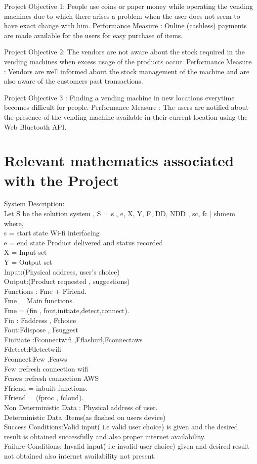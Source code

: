 \documentclass[oneside,a4paper,12pt]{report}
\begin{document}
Project Objective 1:
People use coins or paper money while operating the vending machines due to which there arises a problem when the user does not seem to have exact change with him.
Performance Measure :
Online (cashless) payments are made available for the users for easy purchase of items.

Project Objective 2:
The vendors are not aware about the stock required in the vending machines when excess usage of the products occur.
Performance Measure :
Vendors are well informed about the stock management of the machine and are also aware of the customers past transactions.

Project Objective 3 :
Finding a vending machine in new locations everytime becomes difficult for people.
Performance Measure :
The users are notified about the presence of the vending machine available in their current location using the Web Bluetooth API.
	
\section{Relevant mathematics associated with the Project}
\label{sec:math}
System Description:\\
 Let S be the solution system ,
	  S = {s , e, X, Y, F, DD, NDD , sc, fc | shmem}\\
            where,    \\   
s = start state {Wi-fi interfacing}\\
e = end state { Product delivered and status recorded}\\
X = Input set\\
Y = Output set\\
Input:(Physical address, user’s choice)	\\ 
Output:(Product requested , suggestions)\\ 
Functions : Fme + Ffriend.\\
Fme = Main functions.\\
Fme = (fin , fout,initiate,detect,connect).\\
Fin : {Faddress , Fchoice}\\
Fout:{Fdispose , Fsuggest}\\
Finitiate :{Fconnectwifi ,Fflashurl,Fconnectaws}\\
Fdetect:{Fdetectwifi}\\
Fconnect:{Fcw ,Fcaws}\\
Fcw :refresh connection wifi\\
Fcaws :refresh connection AWS\\
Ffriend = inbuilt functions.\\
Ffriend = (fproc , fcloud).\\
Non Deterministic Data : Physical address of user.\\
Deterministic Data :Items(as flashed on users device)\\
Success Conditions:Valid input( i.e valid user choice) is given and the desired result is obtained successfully and also proper internet availability.\\
Failure Conditions: Invalid input( i.e invalid user choice)  given and desired result not obtained also internet availability not present.\\
\end{document}
